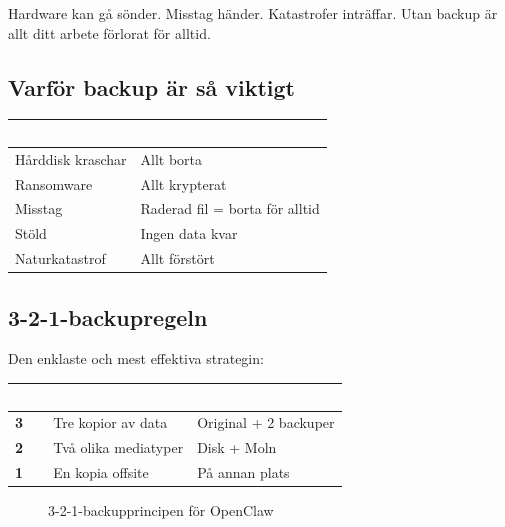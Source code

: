 \documentclass[12pt,a4paper,swedish]{article}
\begin{document}
Hardware kan gå sönder. Misstag händer. Katastrofer inträffar. Utan backup är allt ditt arbete förlorat för alltid.

\subsection{Varför backup är så viktigt}
\label{sec:varfor-backup}

\begin{center}
\begin{tabular}{|l|p{8cm}|}
\hline
\rowcolor{warning}
\textcolor{white}{\textbf{Scenario}} & \textcolor{white}{\textbf{Konsekvens}} \\
\hline
Hårddisk kraschar & Allt borta \\
\hline
Ransomware & Allt krypterat \\
\hline
Misstag & Raderad fil = borta för alltid \\
\hline
Stöld & Ingen data kvar \\
\hline
Naturkatastrof & Allt förstört \\
\hline
\end{tabular}
\end{center}

\subsection{3-2-1-backupregeln}
\label{sec:321}

Den enklaste och mest effektiva strategin:

\begin{center}
\begin{tabular}{|p{2cm}|p{6cm}|p{6cm}|}
\hline
\rowcolor{primary}
\textcolor{white}{\textbf{Del}} & \textcolor{white}{\textbf{Betydelse}} & \textcolor{white}{\textbf{Exempel}} \\
\hline
\textbf{3} & Tre kopior av data & Original + 2 backuper \\
\hline
\textbf{2} & Två olika mediatyper & Disk + Moln \\
\hline
\textbf{1} & En kopia offsite & På annan plats \\
\hline
\end{tabular}
\end{center}

\bigskip

\begin{figure}[h!]
\centering
{}
\caption{3-2-1-backupprincipen för OpenClaw}
\end{figure}
\end{document}

